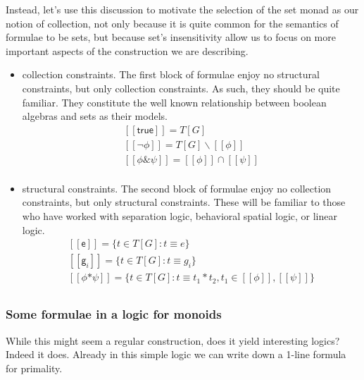 \documentclass[]{acm_proc_article-sp}
\newcommand{\ldb}{[\![}
\newcommand{\rdb}{]\!]}
\newcommand{\scong}{\mathbin{\equiv}}
\newcommand{\meaningof}[1]{\ldb #1 \rdb}
\numberwithin{equation}{subsection}
\begin{document}
Instead, let's use this discussion to motivate the selection of the
set monad as our notion of collection, not only because it is quite
common for the semantics of formulae to be sets, but because set's
insensitivity allow us to focus on more important aspects of the
construction we are describing.

\begin{itemize}
\item collection constraints. The first block of formulae enjoy no
  structural constraints, but only collection constraints. As such,
  they should be quite familiar. They constitute the well known
  relationship between boolean algebras and sets as their models.
    \begin{equation*}
      \begin{aligned}
        \meaningof{\mathsf{true}} = T[G] \\
        \meaningof{\mathsf{\neg}\phi} = T[G] \backslash \meaningof{\phi} \\
        \meaningof{\phi \mathsf{\&} \psi} = \meaningof{\phi} \cap \meaningof{\psi} \\
      \end{aligned}
    \end{equation*}
  \item structural constraints. The second block of formulae enjoy no
    collection constraints, but only structural constraints. These
    will be familiar to those who have worked with separation logic,
    behavioral spatial logic, or linear logic.
    \begin{equation*}
      \begin{aligned}
        \meaningof{\mathsf{e}} = \{ t \in T[G] : t \scong e \} \\
        \meaningof{\mathsf{g}_i} = \{ t \in T[G] : t \scong g_i \}  \\
        \meaningof{\phi \mathsf{*} \psi} = \{ t \in T[G] : t \scong t_1 * t_2, t_1 \in \meaningof{\phi}, \meaningof{\psi} \} \\
      \end{aligned}
    \end{equation*}
\end{itemize}


\subsubsection{Some formulae in a logic for monoids}

While this might seem a regular construction, does it yield
interesting logics? Indeed it does. Already in this simple logic we
can write down a 1-line formula for primality.
\end{document}
